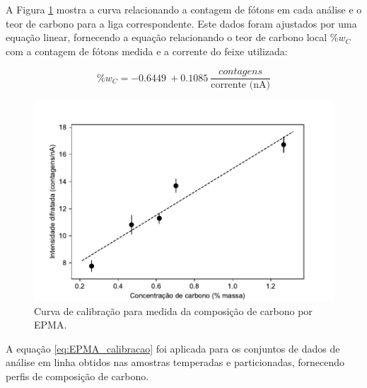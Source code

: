 A Figura \ref{fig:padrao_EPMA} mostra a curva relacionando a contagem de fótons em cada análise e o teor de carbono para a liga correspondente. Este dados foram ajustados por uma equação linear, fornecendo a equação relacionando o teor de carbono local $\%w_C$ com a contagem de fótons medida e a corrente do feixe utilizada:

\begin{equation}
  \%w_C = \SI{-0.6449}{} + \SI{0.1085}{} \frac{contagens}{\text{corrente (nA)}} \label{eq:EPMA_calibracao}
\end{equation}

\begin{figure}
  \centering
  \includegraphics[width=.9\textwidth]{img/EPMA/calibracao_EPMA.pdf}
  \caption{Curva de calibração para medida da composição de carbono por EPMA.}
  \label{fig:padrao_EPMA}
\end{figure}

A equação \ref{eq:EPMA_calibracao} foi aplicada para os conjuntos de dados de análise em linha obtidos nas amostras temperadas e particionadas, fornecendo perfis de composição de carbono.


